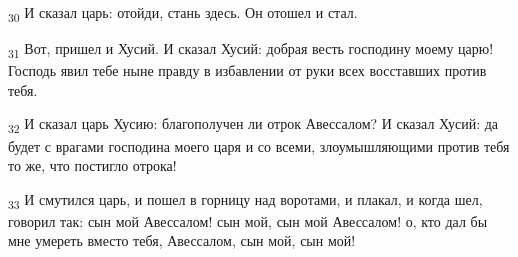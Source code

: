 \begin{tcolorbox}
\textsubscript{30} И сказал царь: отойди, стань здесь. Он отошел и стал.
\end{tcolorbox}
\begin{tcolorbox}
\textsubscript{31} Вот, пришел и Хусий. И сказал Хусий: добрая весть господину моему царю! Господь явил тебе ныне правду в избавлении от руки всех восставших против тебя.
\end{tcolorbox}
\begin{tcolorbox}
\textsubscript{32} И сказал царь Хусию: благополучен ли отрок Авессалом? И сказал Хусий: да будет с врагами господина моего царя и со всеми, злоумышляющими против тебя то же, что постигло отрока!
\end{tcolorbox}
\begin{tcolorbox}
\textsubscript{33} И смутился царь, и пошел в горницу над воротами, и плакал, и когда шел, говорил так: сын мой Авессалом! сын мой, сын мой Авессалом! о, кто дал бы мне умереть вместо тебя, Авессалом, сын мой, сын мой!
\end{tcolorbox}
